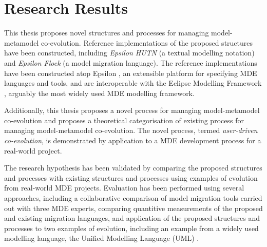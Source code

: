 
\section{Research Results}
\label{sec:research_results}

This thesis proposes novel structures and processes for managing model-metamodel co-evolution. Reference implementations of the proposed structures have been constructed, including \emph{Epsilon HUTN} (a textual modelling notation) and \emph{Epsilon Flock} (a model migration language). The reference implementations have been constructed atop Epsilon \cite{kolovos09thesis}, an extensible platform for specifying MDE languages and tools, and are interoperable with the Eclipse Modelling Framework \cite{steinberg09emf}, arguably the most widely used MDE modelling framework.

Additionally, this thesis proposes a novel process for managing model-metamodel co-evolution and proposes a theoretical categorisation of existing process for managing model-metamodel co-evolution. The novel process, termed \emph{user-driven co-evolution}, is demonstrated by application to a MDE development process for a real-world project.

The research hypothesis has been validated by comparing the proposed structures and processes with existing structures and processes using examples of evolution from real-world MDE projects. Evaluation has been performed using several approaches, including a collaborative comparison of model migration tools carried out with three MDE experts, comparing quantitive measurements of the proposed and existing migration languages, and application of the proposed structures and processes to two examples of evolution, including an example from a widely used modelling language, the Unified Modelling Language (UML) \cite{uml212}.




